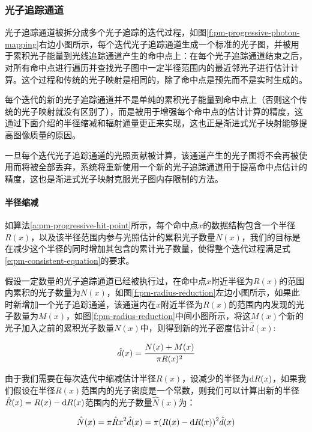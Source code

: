 \subsubsection{光子追踪通道}
光子追踪通道被拆分成多个光子追踪的迭代过程，如图\ref{f:pm-progressive-photon-mapping}右边小图所示，每个迭代光子追踪通道生成一个标准的光子图，并被用于累积光子能量到光线追踪通道产生的命中点上：在每个光子追踪通道结束之后，对所有命中点进行遍历并查找光子图中一定半径范围内的最近邻光子进行估计计算。这个过程和传统的光子映射是相同的，除了命中点是预先而不是实时生成的。

每个迭代的新的光子追踪通道并不是单纯的累积光子能量到命中点上（否则这个传统的光子映射就没有区别了），而是被用于增强每个命中点的估计计算的精度，这通过下面介绍的半径缩减和辐射通量更正来实现，这也正是渐进式光子映射能够提高图像质量的原因。

一旦每个迭代光子追踪通道的光照贡献被计算，该通道产生的光子图将不会再被使用而将被全部丢弃，系统将重新使用一个新的光子追踪通道用于提高命中点估计的精度，这也是渐进式光子映射克服光子图内存限制的方法。





\paragraph{半径缩减}
如算法\ref{a:pm-progressive-hit-point}所示，每个命中点$x$的数据结构包含一个半径$R(x)$，以及该半径范围内参与光照估计的累积光子数量$N(x)$，我们的目标是在减少这个半径的同时增加其包含的累计光子数量，使得整个迭代过程满足式\ref{e:pm-consistent-equation}的要求。

假设一定数量的光子追踪通道已经被执行过，在命中点$x$附近半径为$R(x)$的范围内累积的光子数量为$N(x)$，如图\ref{f:pm-radius-reduction}左边小图所示，如果此时新增加一个光子追踪通道，该通道内在$x$附近半径为$R(x)$的范围内内发现的光子数量为$M(x)$，如图\ref{f:pm-radius-reduction}中间小图所示，将这$M(x)$个新的光子加入之前的累积光子数量$N(x)$中，则得到新的光子密度估计$\hat{d}(x)$:

\begin{equation}\label{e:radius-reduction-1}
	\hat{d}(x)= \cfrac{N(x)+M(x)}{\pi R(x)^{2}}
\end{equation}

由于我们需要在每次迭代中缩减估计半径$R(x)$，设减少的半径为${\rm d}R(x)$，如果我们假设在半径$R(x)$范围内的光子密度是一个常数，则我们可以计算出新的半径$\hat{R}(x)=R(x)-{\rm d}R(x)$范围内的光子数量$\hat{N}(x)$为：

\begin{equation}\label{e:radius-reduction-2}
	\hat{N}(x)=\pi\hat{R}{x}^{2}\hat{d}(x)=\pi (R(x)-{\rm d}R(x))^{2}\hat{d}(x)
\end{equation}


